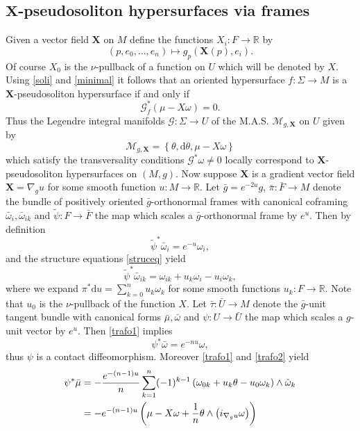 \documentclass[11pt,letterpaper]{amsart}
\theoremstyle{definition}
\numberwithin{equation}{section}
\begin{document}
\subsection{${\mathbf{X}}$-pseudosoliton hypersurfaces via frames} 
Given a vector field ${\mathbf{X}}$ on $M$ define the functions $X_i : F \to {\mathbb{R}}$ by 
\begin{equation}\label{comp}
(p,e_0,\ldots,e_n) \mapsto g_p({\mathbf{X}}(p),e_i).
\end{equation}
Of course $X_0$ is the $\nu$-pullback of a function on $U$ which will be denoted by $X$. Using \eqref{soli} and \eqref{minimal} it follows that an oriented hypersurface $f : \Sigma \to M$ is a ${\mathbf{X}}$-pseudosoliton hypersurface if and only if 
$$
\mathcal{G}_f^*\left(\mu-X\omega\right)=0. 
$$ 
Thus the Legendre integral manifolds $\mathcal{G} : \Sigma \to U$ of the M.A.S. $\mathcal{M}_{g,{\mathbf{X}}}$ on $U$ given by
$$
\mathcal{M}_{g,{\mathbf{X}}}=\left\{\theta,{\mathrm{d}}\theta,\mu-X\omega\right\}
$$
which satisfy the transversality conditions $\mathcal{G}^*\omega\neq0$ locally correspond to ${\mathbf{X}}$-pseudo\-soliton hypersurfaces on $(M,g)$. 
Now suppose ${\mathbf{X}}$ is a gradient vector field ${\mathbf{X}}=\nabla_g u$ for some smooth function $u : M \to {\mathbb{R}}$. Let $\bar{g}=e^{-2u}g$, $\bar{\pi} : \bar{F} \to M$ denote the bundle of positively oriented $\bar{g}$-orthonormal frames with canonical coframing $\bar{\omega}_i, \bar{\omega}_{ik}$ and $\tilde{\psi} : F \to \bar{F}$ the map which scales a $\bar{g}$-orthonormal frame by $e^{u}$. Then by definition
\begin{equation}\label{trafo1}
\tilde{\psi}^*\bar{\omega}_i=e^{-u}\omega_i,
\end{equation}
and the structure equations \eqref{struceq} yield
\begin{equation}\label{trafo2}
\tilde{\psi}^*\bar{\omega}_{ik}=\omega_{ik}+u_k\omega_i-u_i\omega_k,
\end{equation}
where we expand $\pi^*{\mathrm{d}} u=\sum_{k=0}^n u_k \omega_k$ for some smooth functions $u_k : F \to {\mathbb{R}}$. Note that $u_0$ is the $\nu$-pullback of the function $X$. Let $\bar{\tau} : \bar{U} \to M$ denote the $\bar{g}$-unit tangent bundle with canonical forms $\bar{\mu},\bar{\omega}$ and $\psi : U \to \bar{U}$ the map which scales a $g$-unit vector by $e^u$. Then \eqref{trafo1} implies
$$
\psi^*\bar{\omega}=e^{-nu}\omega,
$$
thus $\psi$ is a contact diffeomorphism. Moreover \eqref{trafo1} and \eqref{trafo2} yield
\begin{equation}\label{pullback}
\aligned
\psi^*\bar{\mu}&=-\frac{e^{-(n-1)u}}{n}\sum_{k=1}^n (-1)^{k-1}\left(\omega_{0k}+u_k\theta-u_0\omega_k\right)\wedge \hat{\omega}_k\\
&=-e^{-(n-1)u}\left(\mu-X\omega+\frac{1}{n}\theta\wedge\left(i_{\nabla_g u}\omega\right)\right)\\
\endaligned
\end{equation}
\end{document}
